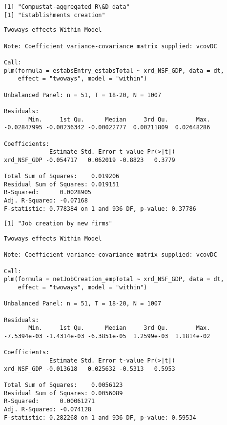 \documentclass[11pt]{article}
\begin{document}
    \begin{Verbatim}[commandchars=\\\{\}]
[1] "Compustat-aggregated R\&D data"
[1] "Establishments creation"

    \end{Verbatim}

    
    \begin{verbatim}
Twoways effects Within Model

Note: Coefficient variance-covariance matrix supplied: vcovDC

Call:
plm(formula = estabsEntry_estabsTotal ~ xrd_NSF_GDP, data = dt, 
    effect = "twoways", model = "within")

Unbalanced Panel: n = 51, T = 18-20, N = 1007

Residuals:
       Min.     1st Qu.      Median     3rd Qu.        Max. 
-0.02847995 -0.00236342 -0.00022777  0.00211809  0.02648286 

Coefficients:
             Estimate Std. Error t-value Pr(>|t|)
xrd_NSF_GDP -0.054717   0.062019 -0.8823   0.3779

Total Sum of Squares:    0.019206
Residual Sum of Squares: 0.019151
R-Squared:      0.0028905
Adj. R-Squared: -0.07168
F-statistic: 0.778384 on 1 and 936 DF, p-value: 0.37786
    \end{verbatim}

    
    \begin{Verbatim}[commandchars=\\\{\}]
[1] "Job creation by new firms"

    \end{Verbatim}

    
    \begin{verbatim}
Twoways effects Within Model

Note: Coefficient variance-covariance matrix supplied: vcovDC

Call:
plm(formula = netJobCreation_empTotal ~ xrd_NSF_GDP, data = dt, 
    effect = "twoways", model = "within")

Unbalanced Panel: n = 51, T = 18-20, N = 1007

Residuals:
       Min.     1st Qu.      Median     3rd Qu.        Max. 
-7.5394e-03 -1.4314e-03 -6.3851e-05  1.2599e-03  1.1814e-02 

Coefficients:
             Estimate Std. Error t-value Pr(>|t|)
xrd_NSF_GDP -0.013618   0.025632 -0.5313   0.5953

Total Sum of Squares:    0.0056123
Residual Sum of Squares: 0.0056089
R-Squared:      0.00061271
Adj. R-Squared: -0.074128
F-statistic: 0.282268 on 1 and 936 DF, p-value: 0.59534
    \end{verbatim}
\end{document}
